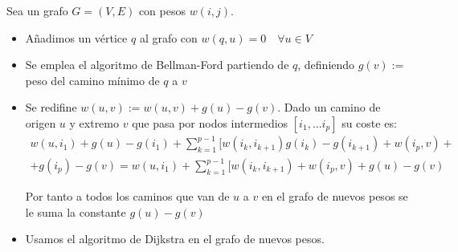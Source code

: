 \documentclass[a4paper, 11pt]{article} %
\begin{document}
      Sea un grafo $G=(V,E)$ con pesos $w(i,j)$. 
      
    \begin{itemize}
      \item Añadimos un vértice $q$ al grafo con $w(q,u) = 0 \quad \forall u \in V$
      \item Se emplea el algoritmo de Bellman-Ford partiendo de $q$, definiendo
	$g(v):=$peso del camino mínimo de $q$ a $v$
      \item Se redifine $w(u,v):=w(u,v) + g(u)-g(v)$. Dado un camino de origen $u$ y
	extremo $v$ que pasa por nodos intermedios $[i_1,\ldots i_p]$ su coste es:
	\begin{eqnarray*}
	w(u,i_1) + g(u) -g(i_1) + \sum_{k=1}^{p-1} [w(i_{k},i_{k+1}) g(i_k) - g(i_{k+1}) + w(i_p,v) + \\
	+ g(i_p)- g(v) = w(u,i_1) + \sum_{k=1}^{p-1} [w(i_{k},i_{k+1}) + w(i_p,v) + g(u) - g(v)
	\end{eqnarray*}
	
	Por tanto a todos los caminos que van de $u$ a $v$ en el grafo de nuevos pesos
	se le suma la constante $g(u) - g(v)$
      \item Usamos el algoritmo de Dijkstra en el grafo de nuevos pesos.
    \end{itemize}
\end{document}
